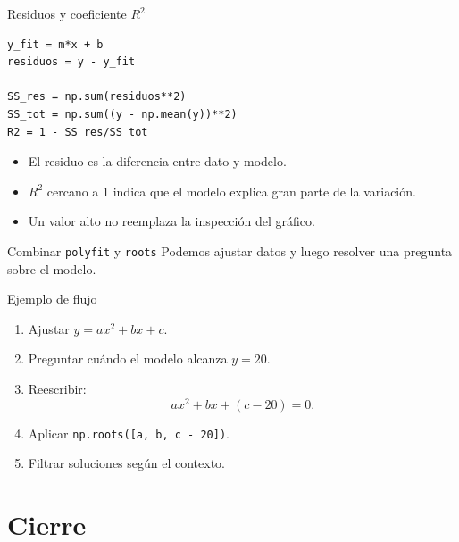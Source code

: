 \documentclass[10pt]{beamer}
\begin{document}
\begin{frame}[fragile]{Residuos y coeficiente \(R^2\)}
\begin{verbatim}
y_fit = m*x + b
residuos = y - y_fit

SS_res = np.sum(residuos**2)
SS_tot = np.sum((y - np.mean(y))**2)
R2 = 1 - SS_res/SS_tot
\end{verbatim}

  \begin{itemize}
    \item El residuo es la diferencia entre dato y modelo.
    \item \(R^2\) cercano a 1 indica que el modelo explica gran parte de la variación.
    \item Un valor alto no reemplaza la inspección del gráfico.
  \end{itemize}
\end{frame}

\begin{frame}{Combinar \texttt{polyfit} y \texttt{roots}}
  Podemos ajustar datos y luego resolver una pregunta sobre el modelo.

  \begin{block}{Ejemplo de flujo}
    \begin{enumerate}
      \item Ajustar \(y=ax^2+bx+c\).
      \item Preguntar cuándo el modelo alcanza \(y=20\).
      \item Reescribir:
      \[
        ax^2+bx+(c-20)=0.
      \]
      \item Aplicar \texttt{np.roots([a, b, c - 20])}.
      \item Filtrar soluciones según el contexto.
    \end{enumerate}
  \end{block}
\end{frame}

\section{Cierre}
\end{document}
